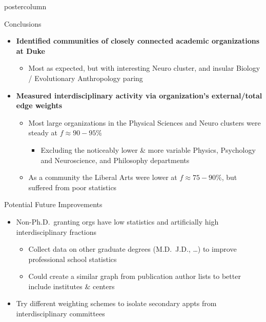 \documentclass{beamer}
\begin{document}
\begin{frame}
\begin{columns}
\begin{column}{.57\textwidth}
\begin{beamercolorbox}[center]{postercolumn}
\begin{minipage}{.98\textwidth}
{  \begin{myblock}{Conclusions}
    \begin{itemize}
      \item \textbf{Identified communities of closely connected academic organizations at Duke}
      \begin{itemize}
        \item Most as expected, but with interesting Neuro cluster, and insular Biology / Evolutionary Anthropology paring
      \end{itemize}
      \item \textbf{Measured interdisciplinary activity via  organization's external/total edge weights }
      \begin{itemize}
        \item Most large organizations in the Physical Sciences and Neuro clusters were steady at $f \approx 90-95\%$
        \begin{itemize}
          \item Excluding the noticeably lower \& more variable Physics, Psychology and Neuroscience, and Philosophy departments
        \end{itemize}
        \item As a community the Liberal Arts were lower at $f \approx 75-90\%$, but suffered from poor statistics
      \end{itemize}
    \end{itemize}
  \end{myblock}\vfill


  \begin{myblock}{Potential Future Improvements}
    \begin{itemize}
      \item Non-Ph.D.\ granting orgs have low statistics and artificially high interdisciplinary fractions
      \begin{itemize}
        \item Collect data on other graduate degrees (M.D.\, J.D., \ldots) to improve professional school statistics
        \item Could create a similar graph from publication author lists to better include institutes \& centers
      \end{itemize}
      \item Try different weighting schemes to isolate secondary appts from interdisciplinary committees
    \end{itemize}
  \end{myblock}\vfill


}
\end{minipage}
\end{beamercolorbox}
\end{column}
\end{columns}
\end{frame}
\end{document}
